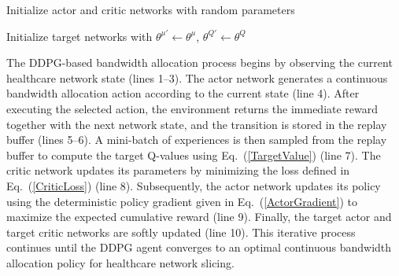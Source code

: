 \documentclass[10pt,journal,compsoc]{IEEEtran}
\begin{document}
\begin{algorithm}[t]
\caption{DDPG-Based Continuous Bandwidth Allocation}
\label{alg:DDPG}

Initialize actor and critic networks with random parameters\;

Initialize target networks with
$\theta^{\mu'}\leftarrow\theta^{\mu}$,
$\theta^{Q'}\leftarrow\theta^{Q}$\;

\end{algorithm}

The DDPG-based bandwidth allocation process begins by observing the current healthcare network state (lines 1--3). The actor network generates a continuous bandwidth allocation action according to the current state (line 4). After executing the selected action, the environment returns the immediate reward together with the next network state, and the transition is stored in the replay buffer (lines 5--6). A mini-batch of experiences is then sampled from the replay buffer to compute the target Q-values using Eq.~(\ref{TargetValue}) (line 7). The critic network updates its parameters by minimizing the loss defined in Eq.~(\ref{CriticLoss}) (line 8). Subsequently, the actor network updates its policy using the deterministic policy gradient given in Eq.~(\ref{ActorGradient}) to maximize the expected cumulative reward (line 9). Finally, the target actor and target critic networks are softly updated (line 10). This iterative process continues until the DDPG agent converges to an optimal continuous bandwidth allocation policy for healthcare network slicing.
\end{document}
